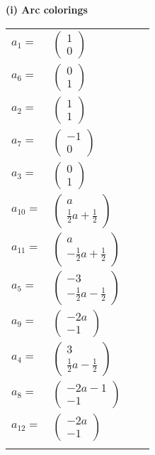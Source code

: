 \documentclass[1p]{elsarticle_modified}
\theoremstyle{definition}
\begin{document}
\flushleft \textbf{(i) Arc colorings}\\
\begin{tabular}{m{7pt} m{180pt} m{7pt} m{180pt} }
\flushright $a_{1}=$&$\begin{pmatrix}1\\0\end{pmatrix}$ \\
\flushright $a_{6}=$&$\begin{pmatrix}0\\1\end{pmatrix}$ \\
\flushright $a_{2}=$&$\begin{pmatrix}1\\1\end{pmatrix}$ \\
\flushright $a_{7}=$&$\begin{pmatrix}-1\\0\end{pmatrix}$ \\
\flushright $a_{3}=$&$\begin{pmatrix}0\\1\end{pmatrix}$ \\
\flushright $a_{10}=$&$\begin{pmatrix}a\\\frac{1}{2} a+\frac{1}{2}\end{pmatrix}$ \\
\flushright $a_{11}=$&$\begin{pmatrix}a\\-\frac{1}{2} a+\frac{1}{2}\end{pmatrix}$ \\
\flushright $a_{5}=$&$\begin{pmatrix}-3\\-\frac{1}{2} a-\frac{1}{2}\end{pmatrix}$ \\
\flushright $a_{9}=$&$\begin{pmatrix}-2 a\\-1\end{pmatrix}$ \\
\flushright $a_{4}=$&$\begin{pmatrix}3\\\frac{1}{2} a-\frac{1}{2}\end{pmatrix}$ \\
\flushright $a_{8}=$&$\begin{pmatrix}-2 a-1\\-1\end{pmatrix}$ \\
\flushright $a_{12}=$&$\begin{pmatrix}-2 a\\-1\end{pmatrix}$\\&\end{tabular}
\end{document}
